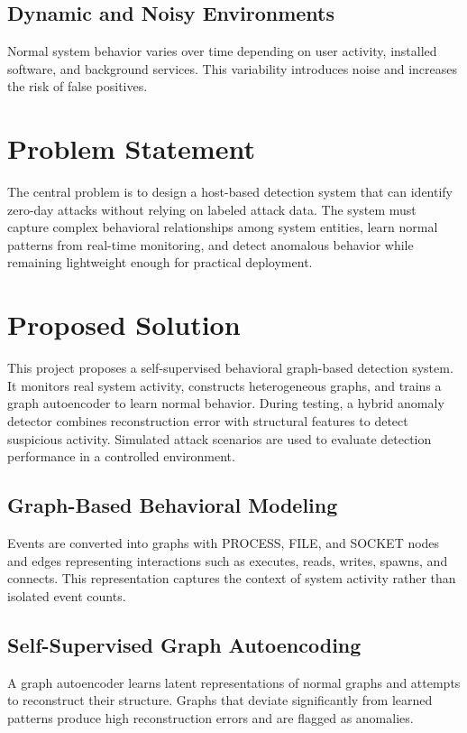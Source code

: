 \subsection{Dynamic and Noisy Environments}
Normal system behavior varies over time depending on user activity, installed
software, and background services. This variability introduces noise and increases
the risk of false positives.

\section{Problem Statement}
The central problem is to design a host-based detection system that can identify
zero-day attacks without relying on labeled attack data. The system must capture
complex behavioral relationships among system entities, learn normal patterns from
real-time monitoring, and detect anomalous behavior while remaining lightweight
enough for practical deployment.

\section{Proposed Solution}
This project proposes a self-supervised behavioral graph-based detection system.
It monitors real system activity, constructs heterogeneous graphs, and trains a
graph autoencoder to learn normal behavior. During testing, a hybrid anomaly
detector combines reconstruction error with structural features to detect suspicious
activity. Simulated attack scenarios are used to evaluate detection performance in
a controlled environment.

\subsection{Graph-Based Behavioral Modeling}
Events are converted into graphs with PROCESS, FILE, and SOCKET nodes and edges
representing interactions such as executes, reads, writes, spawns, and connects.
This representation captures the context of system activity rather than isolated
event counts.

\subsection{Self-Supervised Graph Autoencoding}
A graph autoencoder learns latent representations of normal graphs and attempts to
reconstruct their structure. Graphs that deviate significantly from learned patterns
produce high reconstruction errors and are flagged as anomalies.

